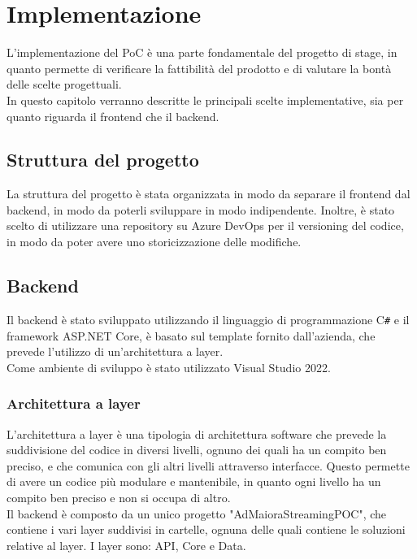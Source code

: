 \chapter{Implementazione}
\label{cap:implementazione}

L'implementazione del PoC è una parte fondamentale del progetto di stage, in quanto permette di verificare la fattibilità del prodotto e di valutare la bontà delle scelte progettuali.\\
In questo capitolo verranno descritte le principali scelte implementative, sia per quanto riguarda il frontend che il backend.\\

\section{Struttura del progetto}
La struttura del progetto è stata organizzata in modo da separare il frontend dal backend, in modo da poterli sviluppare in modo indipendente. Inoltre, è stato scelto di utilizzare una repository su Azure DevOps per il versioning del codice, in modo da poter avere uno storicizzazione delle modifiche.
\section{Backend}
Il backend è stato sviluppato utilizzando il linguaggio di programmazione C\texttt{\#} e il framework ASP.NET Core, è basato sul template fornito dall'azienda, che prevede l'utilizzo di un'architettura a layer.\\
Come ambiente di sviluppo è stato utilizzato Visual Studio 2022.\\
\subsection{Architettura a layer}
L'architettura a layer è una tipologia di architettura software che prevede la suddivisione del codice in diversi livelli, ognuno dei quali ha un compito ben preciso, e che comunica con gli altri livelli attraverso interfacce. Questo permette di avere un codice più modulare e mantenibile, in quanto ogni livello ha un compito ben preciso e non si occupa di altro.\\
Il backend è composto da un unico progetto "AdMaioraStreamingPOC", che contiene i vari layer suddivisi in cartelle, ognuna delle quali contiene le soluzioni relative al layer. I layer sono: API, Core e Data.\\

